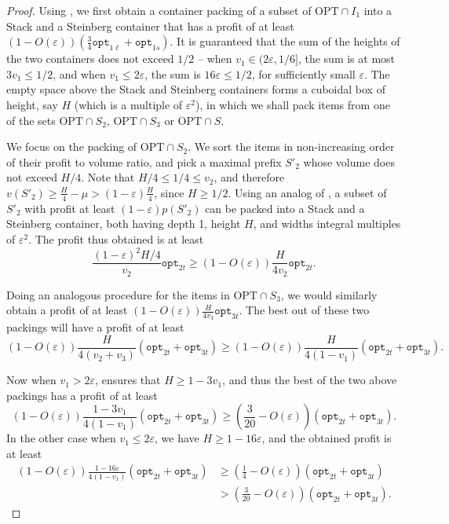 \documentclass[10pt,a4paper]{amsart}
\renewcommand{\epsilon}{\varepsilon} %
\theoremstyle{definition}
\newcommand{\optonel}{\mathtt{opt}_{1\ell}}
\newcommand{\optones}{\mathtt{opt}_{1s}}
\newcommand{\opttwot}{\mathtt{opt}_{2t}}
\newcommand{\optthreet}{\mathtt{opt}_{3t}}
\begin{document}
\begin{proof}
    Using , we first obtain a container packing of a subset of $\text{OPT}\cap I_1$ into a Stack and a Steinberg container that has a profit of at least $(1-O(\epsilon))(\frac{3}{4}\optonel+\optones)$. It is guaranteed that the sum of the heights of the two containers does not exceed $1/2$ -- when $v_1 \in (2\epsilon, 1/6]$, the sum is at most $3v_1 \le 1/2$, and when $v_1 \le 2\epsilon$, the sum is $16\epsilon \le 1/2$, for sufficiently small $\epsilon$. The empty space above the Stack and Steinberg containers forms a cuboidal box of height, say $H$ (which is a multiple of $\epsilon^2$), in which we shall pack items from one of the sets $\text{OPT}\cap S_2$, $\text{OPT}\cap S_3$ or $\text{OPT}\cap S$. 

    We focus on the packing of $\text{OPT}\cap S_2$. We sort the items in non-increasing order of their profit to volume ratio, and pick a maximal prefix $S'_2$ whose volume does not exceed $H/4$. Note that $H/4 \le 1/4\le v_2$, and therefore $v(S'_2) \ge \frac{H}{4}-\mu > (1-\epsilon)\frac{H}{4}$, since $H\ge 1/2$. Using an analog of , a subset of $S'_2$ with profit at least $(1-\epsilon)p(S'_2)$ can be packed into a Stack and a Steinberg container, both having depth 1, height $H$, and widths integral multiples of $\epsilon^2$. The profit thus obtained is at least
    \[ \frac{(1-\epsilon)^2 H/4}{v_2}\opttwot \ge (1-O(\epsilon))\frac{H}{4v_2}\opttwot.\]

    Doing an analogous procedure for the items in $\text{OPT}\cap S_3$, we would similarly obtain a profit of at least $(1-O(\epsilon))\frac{H}{4v_3}\optthreet$. The best out of these two packings will have a profit of at least
    \[(1-O(\epsilon))\frac{H}{4(v_2+v_3)}(\opttwot + \optthreet) \ge (1-O(\epsilon))\frac{H}{4(1-v_1)}(\opttwot + \optthreet).\]

    Now when $v_1 > 2\epsilon$,  ensures that $H\ge 1-3v_1$, and thus the best of the two above packings has a profit of at least
    \[ (1-O(\epsilon))\frac{1-3v_1}{4(1-v_1)}(\opttwot + \optthreet) \ge \left(\frac{3}{20}-O(\epsilon)\right)(\opttwot + \optthreet).\]
    In the other case when $v_1 \le 2\epsilon$, we have $H \ge 1-16\epsilon$, and the obtained profit is at least 
    \begin{align*}
        (1-O(\epsilon))\frac{1-16\epsilon}{4(1-v_1)}(\opttwot + \optthreet) &\ge \left(\frac{1}{4}-O(\epsilon)\right)(\opttwot + \optthreet)\\ 
        &> \left(\frac{3}{20}-O(\epsilon)\right)(\opttwot + \optthreet).
    \end{align*}


\end{proof}
\end{document}
